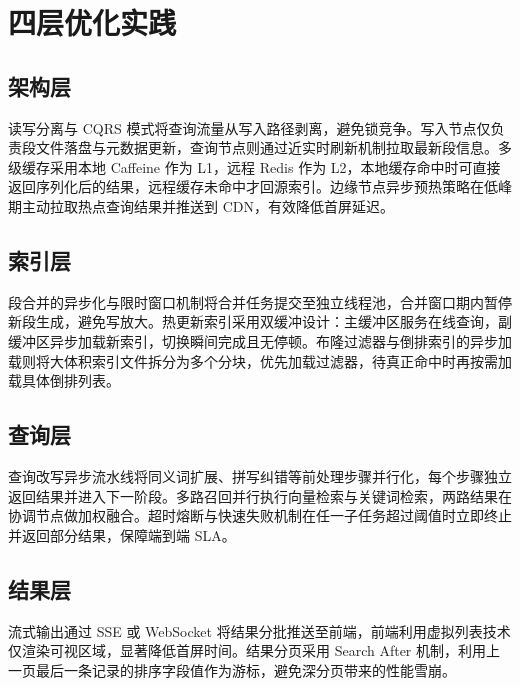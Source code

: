 \chapter{四层优化实践}
\section{架构层}
读写分离与 CQRS 模式将查询流量从写入路径剥离，避免锁竞争。写入节点仅负责段文件落盘与元数据更新，查询节点则通过近实时刷新机制拉取最新段信息。多级缓存采用本地 Caffeine 作为 L1，远程 Redis 作为 L2，本地缓存命中时可直接返回序列化后的结果，远程缓存未命中才回源索引。边缘节点异步预热策略在低峰期主动拉取热点查询结果并推送到 CDN，有效降低首屏延迟。\par
\section{索引层}
段合并的异步化与限时窗口机制将合并任务提交至独立线程池，合并窗口期内暂停新段生成，避免写放大。热更新索引采用双缓冲设计：主缓冲区服务在线查询，副缓冲区异步加载新索引，切换瞬间完成且无停顿。布隆过滤器与倒排索引的异步加载则将大体积索引文件拆分为多个分块，优先加载过滤器，待真正命中时再按需加载具体倒排列表。\par
\section{查询层}
查询改写异步流水线将同义词扩展、拼写纠错等前处理步骤并行化，每个步骤独立返回结果并进入下一阶段。多路召回并行执行向量检索与关键词检索，两路结果在协调节点做加权融合。超时熔断与快速失败机制在任一子任务超过阈值时立即终止并返回部分结果，保障端到端 SLA。\par
\section{结果层}
流式输出通过 SSE 或 WebSocket 将结果分批推送至前端，前端利用虚拟列表技术仅渲染可视区域，显著降低首屏时间。结果分页采用 Search After 机制，利用上一页最后一条记录的排序字段值作为游标，避免深分页带来的性能雪崩。\par
